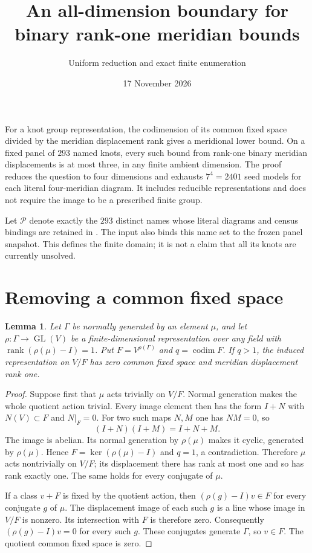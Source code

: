 \documentclass[11pt]{article}
\title{An all-dimension boundary for binary rank-one meridian bounds}
\author{Uniform reduction and exact finite enumeration}
\date{17 November 2026}
\newtheorem{lemma}{Lemma}
\newcommand{\rk}{\operatorname{rank}}
\begin{document}
\maketitle

For a knot group representation, the codimension of its common fixed
space divided by the meridian displacement rank gives a meridional
lower bound. On a fixed panel of $293$ named knots, every such bound
from rank-one binary meridian displacements is at most three, in
any finite ambient dimension. The proof reduces the question to
four dimensions and exhausts $7^4=2401$ seed models for each literal
four-meridian diagram. It includes reducible representations and
does not require the image to be a prescribed finite group.

Let $\mathcal P$ denote exactly the $293$ distinct names whose
literal diagrams and census bindings are retained in
. The input also binds
this name set to the frozen panel snapshot. This defines the finite
domain; it is not a claim that all its knots are currently unsolved.

\section{Removing a common fixed space}

\begin{lemma}\label{lem:reduction}
Let $\Gamma$ be normally generated by an element $\mu$, and let
$\rho:\Gamma\to\operatorname{GL}(V)$ be a finite-dimensional
representation over any field with $\rk(\rho(\mu)-I)=1$.
Put $F=V^{\rho(\Gamma)}$ and $q=\operatorname{codim}F$.
If $q>1$, the induced representation on $V/F$ has zero common
fixed space and meridian displacement rank one.
\end{lemma}
\begin{proof}
Suppose first that $\mu$ acts trivially on $V/F$.
Normal generation makes the whole quotient action trivial.
Every image element then has the form $I+N$ with $N(V)\subset F$
and $N|_F=0$. For two such maps $N,M$ one has $NM=0$, so
\[
                         (I+N)(I+M)=I+N+M.
\]
The image is abelian. Its normal generation by $\rho(\mu)$ makes
it cyclic, generated by $\rho(\mu)$. Hence
$F=\ker(\rho(\mu)-I)$ and $q=1$, a contradiction.
Therefore $\mu$ acts nontrivially on $V/F$; its displacement there
has rank at most one and so has rank exactly one.
The same holds for every conjugate of $\mu$.

If a class $v+F$ is fixed by the quotient action, then
$(\rho(g)-I)v\in F$ for every conjugate $g$ of $\mu$.
The displacement image of each such $g$ is a line whose image in
$V/F$ is nonzero. Its intersection with $F$ is therefore zero.
Consequently $(\rho(g)-I)v=0$ for every such $g$.
These conjugates generate $\Gamma$, so $v\in F$.
The quotient common fixed space is zero.
\end{proof}
\end{document}

